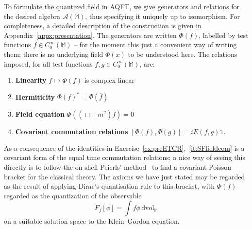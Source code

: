 \documentclass[12pt]{article}
\newcommand{\1}{\mathds{1}}                         %
\newcommand{\MM}{\mathbb{M}}
\newcommand{\II}{{\mathbb{1}}}
\newcommand{\Ac}{{\mathcal{A}}}
\newcommand{\dvol}{{\textrm{dvol}}}
\newcommand{\CoinX}[1]{C_0^\infty(#1)}
\begin{document}
	To formulate the quantized field in AQFT, we give generators and relations for the desired algebra $\Ac(\MM)$, thus specifying it uniquely up to isomorphism. For completeness, a detailed description of the construction is given in Appendix~\ref{appx:presentation}. The generators are written $\Phi(f)$, labelled by test functions $f\in \CoinX{\MM}$ -- for the moment this just a convenient way of writing them; there is no underlying field $\Phi(x)$ to be understood here. The relations imposed, for all test functions $f,g\in\CoinX{\MM}$, are:
	\begin{enumerate}[label=\bf SF\arabic{enumi},leftmargin=*,widest=4] 
		\item\label{it:SFfieldlin} {\bf Linearity} $f\mapsto \Phi(f)$ is complex linear 
		\item {\bf Hermiticity} \label{it:SFfieldcong} $\Phi(f)^*=\Phi(\overline{f})$
		\item\label{it:SFfieldeq} {\bf Field equation}  $\Phi((\Box+ m^2)f)= 0$
		\item\label{it:SFfieldcom} {\bf Covariant commutation relations} $[\Phi(f),\Phi(g)] = iE (f,g)\II$.
	\end{enumerate}
As a consequence of the identities in Exercise~\ref{ex:preETCR},~\ref{it:SFfieldcom} is a covariant form of the equal time commutation relations; a nice way of seeing this directly is to follow the on-shell Peierls' method~\cite{Peierls:1952} to find a covariant Poisson bracket for the classical theory. The axioms we have just stated may be regarded as the result of applying Dirac's quantisation rule to this bracket, with $\Phi(f)$ regarded as the quantization of the observable
	\begin{equation}
	F_f[\phi]=\int f\phi\,\dvol_\MM
	\end{equation} 
	on a suitable solution space to the Klein--Gordon equation.  
	
\end{document}
